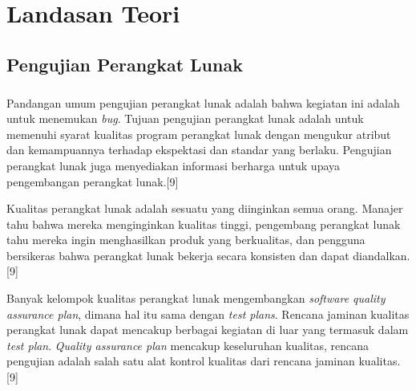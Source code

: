 \chapter{Landasan Teori}
\label{chap:teori}

\section{Pengujian Perangkat Lunak}
\label{softwaretesting}
\paragraph{}
Pandangan umum pengujian perangkat lunak adalah bahwa kegiatan ini adalah untuk menemukan \textit{bug}. Tujuan pengujian perangkat lunak adalah untuk memenuhi syarat kualitas program perangkat lunak dengan mengukur atribut dan kemampuannya terhadap ekspektasi dan standar yang berlaku. Pengujian perangkat lunak juga menyediakan informasi berharga untuk upaya pengembangan perangkat lunak.[9]

Kualitas perangkat lunak adalah sesuatu yang diinginkan semua orang. Manajer tahu bahwa mereka menginginkan kualitas tinggi, pengembang perangkat lunak tahu mereka ingin menghasilkan produk yang berkualitas, dan pengguna bersikeras bahwa perangkat lunak bekerja secara konsisten dan dapat diandalkan.[9]

Banyak kelompok kualitas perangkat lunak mengembangkan \textit{software quality assurance plan}, dimana hal itu sama dengan \textit{test plans}. Rencana jaminan kualitas perangkat lunak dapat mencakup berbagai kegiatan di luar yang termasuk dalam \textit{test plan}. \textit{Quality assurance plan} mencakup keseluruhan kualitas, rencana pengujian adalah salah satu alat kontrol kualitas dari rencana jaminan kualitas.[9]

